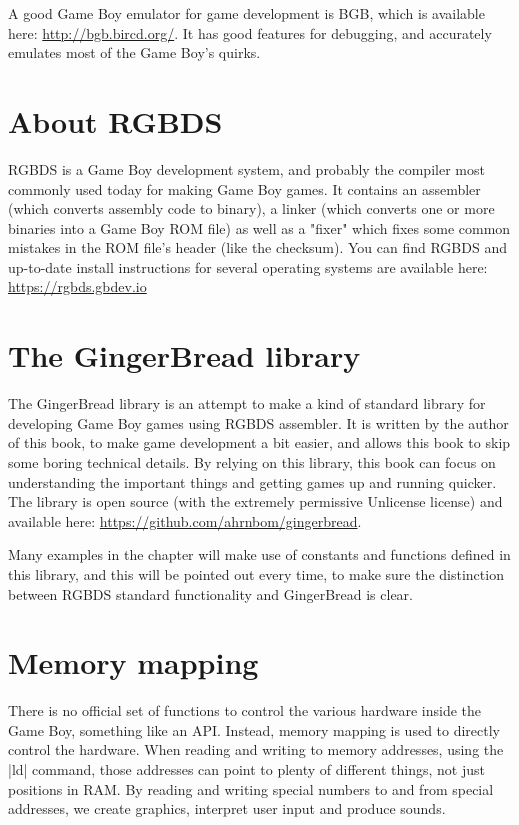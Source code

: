 \documentclass[11pt]{book}
\begin{document}
A good Game Boy emulator for game development is BGB, which is available here: \url{http://bgb.bircd.org/}. It has good features for debugging, and accurately emulates most of the Game Boy's quirks. 

\section{About RGBDS}
\label{rgbds}
RGBDS is a Game Boy development system, and probably the compiler most commonly used today for making Game Boy games. It contains an assembler (which converts assembly code to binary), a linker (which converts one or more binaries into a Game Boy ROM file) as well as a "fixer" which fixes some common mistakes in the ROM file's header (like the checksum). You can find RGBDS and up-to-date install instructions for several operating systems are available here: \url{https://rgbds.gbdev.io}

\section{The GingerBread library}
\label{gingerbread}
The GingerBread library is an attempt to make a kind of standard library for developing Game Boy games using RGBDS assembler. It is written by the author of this book, to make game development a bit easier, and allows this book to skip some boring technical details. By relying on this library, this book can focus on understanding the important things and getting games up and running quicker. The library is open source (with the extremely permissive Unlicense license) and available here: \url{https://github.com/ahrnbom/gingerbread}. 

Many examples in the chapter will make use of constants and functions defined in this library, and this will be pointed out every time, to make sure the distinction between RGBDS standard functionality and GingerBread is clear.

\section{Memory mapping} 
\label{memmapping}
There is no official set of functions to control the various hardware inside the Game Boy, something like an API. Instead, memory mapping is used to directly control the hardware. When reading and writing to memory addresses, using the |ld| command, those addresses can point to plenty of different things, not just positions in RAM. By reading and writing special numbers to and from special addresses, we create graphics, interpret user input and produce sounds.
\end{document}
